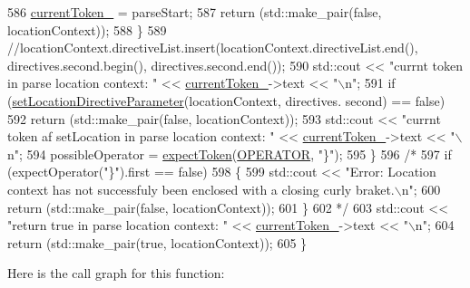 \begin{DoxyCode}
586                 \hyperlink{classft_1_1_parser_a942c5b794d108f144c5b5028aaa34cb6}{currentToken\_} = parseStart;
587                 \textcolor{keywordflow}{return} (std::make\_pair(\textcolor{keyword}{false}, locationContext));
588             \}
589             \textcolor{comment}{//locationContext.directiveList.insert(locationContext.directiveList.end(),
       directives.second.begin(), directives.second.end());}
590             std::cout << \textcolor{stringliteral}{"currnt token in parse location context: "} << 
      \hyperlink{classft_1_1_parser_a942c5b794d108f144c5b5028aaa34cb6}{currentToken\_}->text << \textcolor{stringliteral}{"\(\backslash\)n"};
591             \textcolor{keywordflow}{if} (\hyperlink{classft_1_1_parser_a82bee2278db1afa69bbb6eb6f192743c}{setLocationDirectiveParameter}(locationContext, directives.
      second) == \textcolor{keyword}{false})
592                 \textcolor{keywordflow}{return} (std::make\_pair(\textcolor{keyword}{false}, locationContext));
593             std::cout << \textcolor{stringliteral}{"currnt token af setLocation in parse location context: "} << 
      \hyperlink{classft_1_1_parser_a942c5b794d108f144c5b5028aaa34cb6}{currentToken\_}->text << \textcolor{stringliteral}{"\(\backslash\)n"};
594             possibleOperator = \hyperlink{classft_1_1_parser_a1615a752d3642bb53598e2c8db810db0}{expectToken}(\hyperlink{namespaceft_aa520fbf142ba1e7e659590c07da31921a6411d9d6073252e4d316493506bbb979}{OPERATOR}, \textcolor{stringliteral}{"\}"});
595         \}
596 \textcolor{comment}{/*}
597 \textcolor{comment}{        if (expectOperator("\}").first == false)}
598 \textcolor{comment}{        \{}
599 \textcolor{comment}{            std::cout << "Error: Location context has not successfuly been enclosed with a closing curly
       braket.\(\backslash\)n";}
600 \textcolor{comment}{            return (std::make\_pair(false, locationContext));}
601 \textcolor{comment}{        \}}
602 \textcolor{comment}{*/}
603         std::cout << \textcolor{stringliteral}{"return true in parse location context: "} << \hyperlink{classft_1_1_parser_a942c5b794d108f144c5b5028aaa34cb6}{currentToken\_}->text << \textcolor{stringliteral}{"\(\backslash\)n"};
604         \textcolor{keywordflow}{return} (std::make\_pair(\textcolor{keyword}{true}, locationContext));
605     \}
\end{DoxyCode}
Here is the call graph for this function\+:
\nopagebreak
